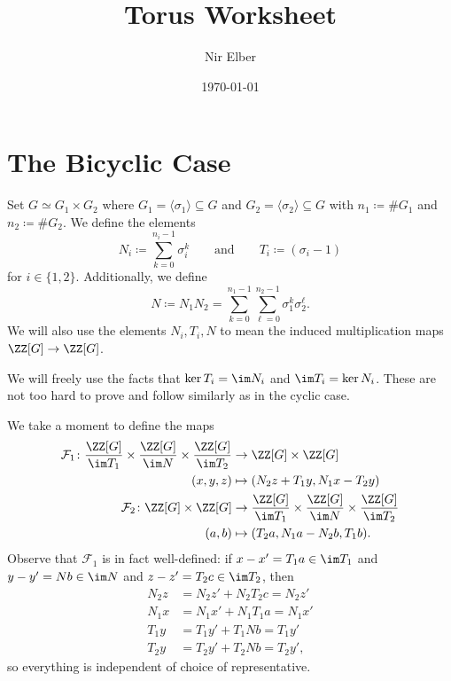 \documentclass{article}
\title{Torus Worksheet}
\author{Nir Elber}
\date{\today}
\begin{document}
\maketitle

\setcounter{tocdepth}{4}
\tableofcontents

\section{The Bicyclic Case}
Set $G\simeq G_1\times G_2$ where $G_1=\langle\sigma_1\rangle\subseteq G$ and $G_2=\langle\sigma_2\rangle\subseteq G$ with $n_1\coloneqq\#G_1$ and $n_2\coloneqq\#G_2$. We define the elements
\[N_i\coloneqq\sum_{k=0}^{n_i-1}\sigma_i^k\qquad\text{and}\qquad T_i\coloneqq(\sigma_i-1)\]
for $i\in\{1,2\}$. Additionally, we define
\[N\coloneqq N_1N_2=\sum_{k=0}^{n_1-1}\sum_{\ell=0}^{n_2-1}\sigma_1^k\sigma_2^\ell.\]
We will also use the elements $N_i,T_i,N$ to mean the induced multiplication maps $\ZZ[G]\to\ZZ[G]$.
\begin{remark}
	We will freely use the facts that $\ker T_i=\im N_i$ and $\im T_i=\ker N_i$. These are not too hard to prove and follow similarly as in the cyclic case.
\end{remark}
We take a moment to define the maps
\begin{align*}
	\mathcal F_1\colon\frac{\ZZ[G]}{\im T_1}\times\frac{\ZZ[G]}{\im N}\times\frac{\ZZ[G]}{\im T_2} &\to \ZZ[G]\times\ZZ[G] \\
	(x,y,z) &\mapsto (N_2z+T_1y,N_1x-T_2y) \\
	\mathcal F_2\colon\ZZ[G]\times\ZZ[G] &\to \frac{\ZZ[G]}{\im T_1}\times\frac{\ZZ[G]}{\im N}\times\frac{\ZZ[G]}{\im T_2} \\
	(a,b) &\mapsto (T_2a,N_1a-N_2b,T_1b).
\end{align*}
Observe that $\mathcal F_1$ is in fact well-defined: if $x-x'=T_1a\in\im T_1$ and $y-y'=Nb\in\im N$ and $z-z'=T_2c\in\im T_2$, then
\begin{align*}
	N_2z &= N_2z' + N_2T_2c = N_2z' \\
	N_1x &= N_1x' + N_1T_1a = N_1x' \\
	T_1y &= T_1y' + T_1Nb = T_1y' \\
	T_2y &= T_2y' + T_2Nb = T_2y',
\end{align*}
so everything is independent of choice of representative.
\end{document}
